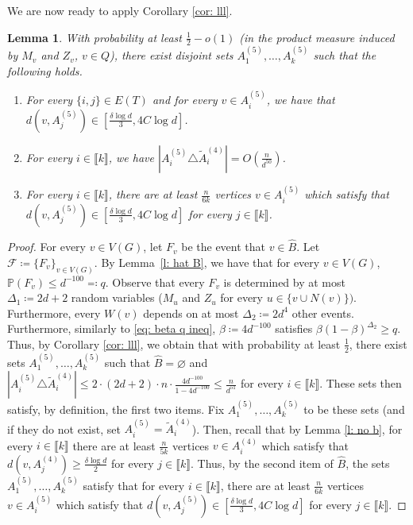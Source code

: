 \documentclass[notitlepage]{scrartcl}
\newcommand{\br}[1]{\llbracket{#1}\rrbracket}
\newtheorem{lemma}[thm]{Lemma}
\begin{document}
We are now ready to apply Corollary \ref{cor: lll}.
\begin{lemma}\label{l: final lll}
With probability at least $\frac{1}{2}-o(1)$ (in the product measure induced by $M_v$ and $Z_v$, $v\in Q$), there exist disjoint sets $A_1^{(5)},\ldots, A_k^{(5)}$ such that the following holds.
\begin{enumerate}
    \item For every $\{i,j\}\in E(T)$ and for every $v\in A_i^{(5)}$, we have that $d(v,A_j^{(5)})\in \left[\frac{\delta\log d}{3},4C\log d\right]$.
    \item For every $i\in \br{k}$, we have $\left|A_i^{(5)}\triangle \tilde{A}_i^{(4)}\right|=O\left(\frac{n}{d^{50}}\right)$.\label{l: final lll item distance}
    \item For every $i\in \br{k}$, there are at least $\frac{n}{6k}$ vertices $v\in A_i^{(5)}$ which satisfy that $d(v,A_j^{(5)})\in \left[\frac{\delta\log d}{3},4C\log d\right]$ for every $j \in \br{k}$. 
\end{enumerate}
\end{lemma}
\begin{proof}
For every $v\in V(G)$, let $F_v$ be the event that $v\in \hat{B}$. Let $\mathcal{F}\coloneqq \{F_v\}_{v\in V(G)}$. By Lemma~\ref{l: hat B}, we have that for every $v\in V(G)$, $\mathbb{P}\left(F_v\right)\le d^{-100}\eqqcolon q$. Observe that every $F_v$ is determined by at most $\Delta_1\coloneqq 2d+2$ random variables ($M_u$ and $Z_u$ for every $u\in \{v\cup N(v)\})$. Furthermore, every $W(v)$ depends on at most $\Delta_2\coloneqq 2d^4$ other events. Furthermore, similarly to \eqref{eq: beta q ineq}, $\beta\coloneqq 4d^{-100}$ satisfies $\beta(1-\beta)^{\Delta_2}\ge q$. Thus, by Corollary \ref{cor: lll}, we obtain that with probability at least $\frac{1}{2}$, there exist sets $A_1^{(5)},\ldots, A_k^{(5)}$ such that $\hat{B}=\varnothing$ and $\left|A_i^{(5)}\triangle \tilde{A}_i^{(4)}\right|\le 2\cdot (2d+2)\cdot n\cdot \frac{4d^{-100}}{1-4d^{-100}}\le \frac{n}{d^{51}}$ for every $i\in \br{k}$. These sets then satisfy, by definition, the first two items. Fix $A_1^{(5)},\ldots, A_k^{(5)}$ to be these sets (and if they do not exist, set $A_i^{(5)}=\tilde{A}_i^{(4)}$). Then, recall that by Lemma \ref{l: no b}, for every $i\in \br{k}$ there are at least $\frac{n}{5k}$ vertices $v\in A_i^{(4)}$ which satisfy that $d(v,A_j^{(4)})\ge \frac{\delta\log d}{2}$ for every $j\in \br{k}$. Thus, by the second item of $\hat{B}$, the sets $A_1^{(5)},\ldots, A_k^{(5)}$ satisfy that for every $i\in \br{k}$, there are at least $\frac{n}{6k}$ vertices $v\in A_i^{(5)}$ which satisfy that $d(v,A_j^{(5)})\in \left[\frac{\delta\log d}{3},4C\log d\right]$ for every $j \in \br{k}$.
\end{proof}
\end{document}
